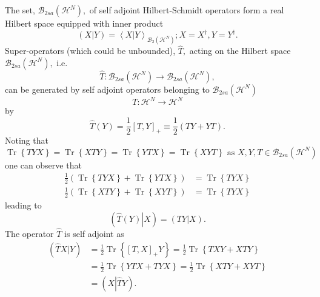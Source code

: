\documentclass[aps,preprint]{revtex4}%
\begin{document}
The set, $\mathcal{B}_{2sa}\left(  \mathcal{H}^{N}\right)  ,$ of self adjoint
Hilbert-Schmidt operators form a real Hilbert space equipped with inner
product
\begin{equation}
\left(  X\left\vert Y\right.  \right)  =\left\langle X\left\vert Y\right.
\right\rangle _{\mathcal{B}_{2}\left(  \mathcal{H}^{N}\right)  };X=X^{\dagger
},Y=Y^{\dagger}.
\end{equation}
Super-operators (which could be unbounded), $\widehat{T},$ acting on the
Hilbert space $\mathcal{B}_{2sa}\left(  \mathcal{H}^{N}\right)  ,$ i.e.
\begin{equation}
\widehat{T}:\mathcal{B}_{2sa}\left(  \mathcal{H}^{N}\right)  \rightarrow
\mathcal{B}_{2sa}\left(  \mathcal{H}^{N}\right)  ,
\end{equation}
can be generated by self adjoint operators belonging to $\mathcal{B}%
_{2sa}\left(  \mathcal{H}^{N}\right)  $
\begin{equation}
T:\mathcal{H}^{N}\rightarrow\mathcal{H}^{N}%
\end{equation}
by%
\begin{equation}
\widehat{T}\left(  Y\right)  =\frac{1}{2}\left[  T,Y\right]  _{+}\equiv
\frac{1}{2}\left(  TY+YT\right)  .
\end{equation}
Noting that
\begin{equation}
\operatorname{Tr}\left\{  TYX\right\}  =\operatorname{Tr}\left\{  XTY\right\}
=\operatorname{Tr}\left\{  YTX\right\}  =\operatorname{Tr}\left\{
XYT\right\}  \text{ as }X,Y,T\in\mathcal{B}_{2sa}\left(  \mathcal{H}%
^{N}\right)
\end{equation}
one can observe that
\begin{align}
\frac{1}{2}\left(  \operatorname{Tr}\left\{  TYX\right\}  +\operatorname{Tr}%
\left\{  YTX\right\}  \right)   &  =\operatorname{Tr}\left\{  TYX\right\}
\nonumber\\
\frac{1}{2}\left(  \operatorname{Tr}\left\{  XTY\right\}  +\operatorname{Tr}%
\left\{  XYT\right\}  \right)   &  =\operatorname{Tr}\left\{  TYX\right\}
\end{align}
leading to
\begin{equation}
\left(  \left.  \widehat{T}\left(  Y\right)  \right\vert X\right)  =\left(
\left.  TY\right\vert X\right)  .
\end{equation}
The operator $\widehat{T}$ is self adjoint as
\begin{align}
\left(  \widehat{T}X\left\vert Y\right.  \right)   &  =\frac{1}{2}%
\operatorname{Tr}\left\{  \left[  T,X\right]  _{+}Y\right\}  =\frac{1}%
{2}\operatorname{Tr}\left\{  TXY+XTY\right\} \nonumber\\
&  =\frac{1}{2}\operatorname{Tr}\left\{  YTX+TYX\right\}  =\frac{1}%
{2}\operatorname{Tr}\left\{  XTY+XYT\right\} \nonumber\\
&  =\left(  X\left\vert \widehat{T}Y\right.  \right)  .
\end{align}
\end{document}
